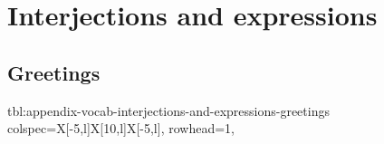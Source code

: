 \documentclass[../nihongo-gakushuu-kyouzai-vocabulary.tex]{subfiles}
\begin{document}
\appendix
\setcounter{section}{0}

\section{Interjections and expressions}


\subsection{Greetings}
{tbl:appendix-vocab-interjections-and-expressions-greetings}  %
{}  %
{
    colspec={X[-5,l]X[10,l]X[-5,l]},
    rowhead=1,
}  %
\end{document}
